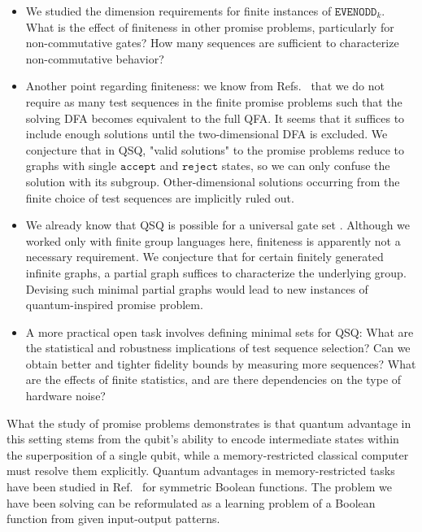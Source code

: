 \documentclass[../main.tex]{subfiles}
\begin{document}
\begin{itemize}
    \item We studied the dimension requirements for finite instances of $\mathtt{EVENODD}_k$. What is the effect of finiteness in other promise problems, particularly for non-commutative gates? How many sequences are sufficient to characterize non-commutative behavior?
    \item Another point regarding finiteness: we know from Refs.~\cite {noller2024classical,noller2024self} that we do not require as many test sequences in the finite promise problems such that the solving DFA becomes equivalent to the full QFA. It seems that it suffices to include enough solutions until the two-dimensional DFA is excluded. 
    We conjecture that in QSQ, "valid solutions" to the promise problems reduce to graphs with single $\mathtt{accept}$ and $\mathtt{reject}$  states, so we can only confuse the solution with its subgroup. Other-dimensional solutions occurring from the finite choice of test sequences are implicitly ruled out.
    \item We already know that QSQ is possible for a universal gate set \cite{noller2024classical}. Although we worked only with finite group languages here, finiteness is apparently not a necessary requirement. We conjecture that for certain finitely generated infinite graphs, a partial graph suffices to characterize the underlying group. Devising such minimal partial graphs would lead to new instances of quantum-inspired promise problem.
    \item A more practical open task involves defining minimal sets for QSQ: What are the statistical and robustness implications of test sequence selection? Can we obtain better and tighter fidelity bounds by measuring more sequences? What are the effects of finite statistics, and are there dependencies on the type of hardware noise?
\end{itemize}

What the study of promise problems demonstrates is that quantum advantage in this setting stems from the qubit's ability to encode intermediate states within the superposition of a single qubit, while a memory-restricted classical computer must resolve them explicitly. Quantum advantages in memory-restricted tasks have been studied in Ref.~\cite{maslov2020quantum} for symmetric Boolean functions. The problem we have been solving can be reformulated as a learning problem of a Boolean function from given input-output patterns.
\end{document}

